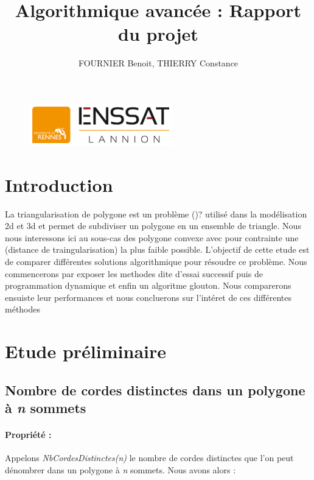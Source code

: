 \documentclass[a4paper,10pt]{article}
\title{Algorithmique avancée : Rapport du projet}
\author{FOURNIER Benoit, THIERRY Constance}
\begin{document}
\maketitle

\begin{figure}[b]
\begin{center}
\includegraphics[scale=1]{Enssat.png}
\end{center}
\end{figure}

\thispagestyle{empty}

\newpage
\null
\thispagestyle{empty}
\newpage

\tableofcontents

\hfill

\listoffigures

\newpage
\null
\thispagestyle{empty}
\newpage

\section{Introduction}

La triangularisation de polygone est un problème ()? 
utilisé dans la modélisation 2d et 3d et permet de subdiviser un polygone en un ensemble de triangle.
Nous nous interessons ici au sous-cas des polygone convexe avec pour contrainte une (distance de traingularisation) la plus faible possible.
L'objectif de cette etude est de comparer différentes solutions algorithmique pour résoudre ce problème.
Nous commencerons par exposer les methodes dite d'essai successif puis de programmation dynamique et enfin un algoritme glouton.
Nous comparerons ensuiste leur performances et nous concluerons sur l'intéret de ces différentes méthodes


\section{Etude préliminaire}

\subsection{Nombre de cordes distinctes dans un polygone à \emph{n} sommets}

\paragraph{Propriété :}
Appelons \emph{NbCordesDistinctes(n)} le nombre de cordes distinctes que l'on peut dénombrer dans un polygone à \emph{n} sommets.
Nous avons alors :
\end{document}
